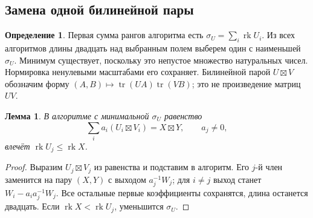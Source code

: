 \documentclass[11pt,a4paper]{article}
\numberwithin{equation}{section}
\theoremstyle{plain}
\newtheorem{lemma}[theorem]{Лемма}
\theoremstyle{definition}
\newtheorem{definition}[theorem]{Определение}
\DeclareMathOperator{\tr}{tr}\DeclareMathOperator{\rk}{rk}
\newcommand{\leqs}{\leqslant}\newcommand{\geqs}{\geqslant}
\begin{document}
\subsection{Замена одной билинейной пары}

\begin{definition}
Первая сумма рангов алгоритма есть $\sigma_U=\sum_i\rk U_i$.
Из всех алгоритмов длины двадцать над выбранным полем выберем один
с наименьшей $\sigma_U$. Минимум существует, поскольку это непустое
множество натуральных чисел. Нормировка ненулевыми масштабами его сохраняет.
Билинейной парой $U\boxtimes V$ обозначим форму
$(A,B)\mapsto\tr(UA)\tr(VB)$; это не произведение матриц $UV$.
\end{definition}

\begin{lemma}\label{lem:exchange}
В алгоритме с минимальной $\sigma_U$ равенство
\[
 \sum_i a_i(U_i\boxtimes V_i)=X\boxtimes Y,\qquad a_j\ne0,
\]
влечёт $\rk U_j\leqs\rk X$.
\end{lemma}
\begin{proof}
Выразим $U_j\boxtimes V_j$ из равенства и подставим в алгоритм.
Его $j$-й член заменится на пару $(X,Y)$ с выходом $a_j^{-1}W_j$;
для $i\ne j$ выход станет $W_i-a_i a_j^{-1}W_j$.
Все остальные первые коэффициенты сохранятся, длина останется двадцать.
Если $\rk X<\rk U_j$, уменьшится $\sigma_U$.
\end{proof}
\end{document}
